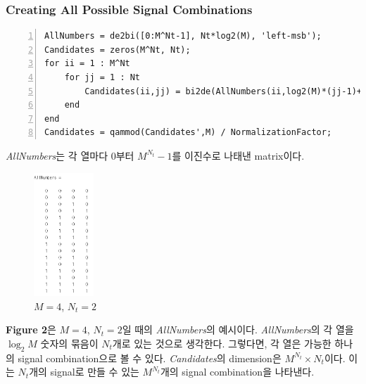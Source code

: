 \documentclass{article}
\newcommand{\bd}{\textbf} %
\begin{document}
\subsubsection{Creating All Possible Signal Combinations}
\begin{lstlisting}[style=Matlab-editor, frame=single, numbers=left,]
% Creating Matrix for all possible combinations of signals (M^Nt possible combinations)
AllNumbers = de2bi([0:M^Nt-1], Nt*log2(M), 'left-msb');
Candidates = zeros(M^Nt, Nt);
for ii = 1 : M^Nt
    for jj = 1 : Nt
        Candidates(ii,jj) = bi2de(AllNumbers(ii,log2(M)*(jj-1)+1:log2(M)*jj), 'left-msb');
    end
end
Candidates = qammod(Candidates',M) / NormalizationFactor;
\end{lstlisting}
\textsl{AllNumbers}는 각 열마다 0부터 $M^{N_t}-1$를 이진수로 나태낸 matrix이다.
\begin{figure}[H]
	\centerline{\includegraphics[width=0.2\textwidth]{AllNumbers.png}}
	\caption{$M=4$, $N_t=2$}
\end{figure}
\bd{Figure 2}은 $M=4$, $N_t=2$일 때의 \textsl{AllNumbers}의 예시이다. \textsl{AllNumbers}의 각 열을 $\log_{2}M$ 숫자의 묶음이 $N_t$개로 있는 것으로 생각한다. 그렇다면, 각 열은 가능한 하나의 signal combination으로 볼 수 있다. \textsl{Candidates}의 dimension은 $M^{N_t}\times N_t$이다. 이는 $N_t$개의 signal로 만들 수 있는 $M^{N_t}$개의 signal combination을 나타낸다.\\
\\
\newpage
\end{document}
